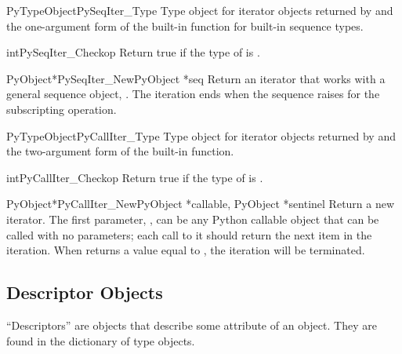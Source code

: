 \begin{cvardesc}{PyTypeObject}{PySeqIter_Type}
  Type object for iterator objects returned by
   and the one-argument form of the
   built-in function for built-in sequence types.
\end{cvardesc}

\begin{cfuncdesc}{int}{PySeqIter_Check}{op}
  Return true if the type of  is .
\end{cfuncdesc}

\begin{cfuncdesc}{PyObject*}{PySeqIter_New}{PyObject *seq}
  Return an iterator that works with a general sequence object,
  .  The iteration ends when the sequence raises
   for the subscripting operation.
\end{cfuncdesc}

\begin{cvardesc}{PyTypeObject}{PyCallIter_Type}
  Type object for iterator objects returned by
   and the two-argument form of the
   built-in function.
\end{cvardesc}

\begin{cfuncdesc}{int}{PyCallIter_Check}{op}
  Return true if the type of  is .
\end{cfuncdesc}

\begin{cfuncdesc}{PyObject*}{PyCallIter_New}{PyObject *callable,
                                             PyObject *sentinel}
  Return a new iterator.  The first parameter, , can be
  any Python callable object that can be called with no parameters;
  each call to it should return the next item in the iteration.  When
   returns a value equal to , the
  iteration will be terminated.
\end{cfuncdesc}


\subsection{Descriptor Objects \label{descriptor-objects}}

``Descriptors'' are objects that describe some attribute of an object.
They are found in the dictionary of type objects.

